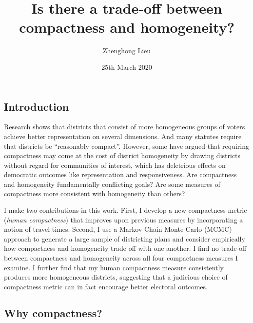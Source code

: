 \documentclass[]{article}
\title{Is there a trade-off between compactness and homogeneity?}
\author{Zhenghong Lieu}
\date{25th March 2020}
\begin{document}
\maketitle

\def\citeapos#1{\citeauthor{#1}'s (\citeyear{#1})}

\hypertarget{introduction}{%
\subsection{Introduction}\label{introduction}}

Research shows that districts that consist of more homogeneous groups of
voters achieve better representation on several dimensions. And many
statutes require that districts be ``reasonably compact''. However, some
have argued that requiring compactness may come at the cost of district
homogeneity by drawing districts without regard for communities of
interest, which has deletrious effects on democratic outcomes like
representation and responsiveness. Are compactness and homogeneity
fundamentally conflicting goals? Are some measures of compactness more
consistent with homogeneity than others?

I make two contributions in this work. First, I develop a new
compactness metric (\emph{human compactness}) that improves upon
previous measures by incorporating a notion of travel times. Second, I
use a Markov Chain Monte Carlo (MCMC) approach to generate a large
sample of districting plans and consider empirically how compactness and
homogeneity trade off with one another. I find no trade-off between
compactness and homogeneity across all four compactness measures I
examine. I further find that my human compactness measure consistently
produces more homogeneous districts, suggesting that a judicious choice
of compactness metric can in fact encourage better electoral outcomes.

\hypertarget{why-compactness}{%
\subsection{Why compactness?}\label{why-compactness}}
\end{document}
